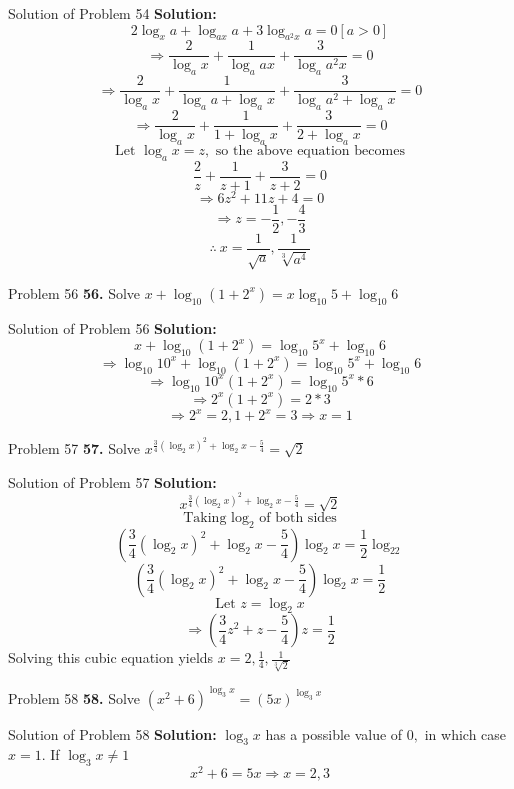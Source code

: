 \documentclass[aspectratio=1610,8pt]{beamer}
\begin{document}
\begin{frame}{Solution of Problem 54}
  \textbf{Solution:} $$2\log_xa + \log_{ax}a + 3\log_{a^2x}a = 0[a > 0]$$
  $$\Rightarrow \frac{2}{\log_ax} + \frac{1}{\log_aax} + \frac{3}{\log_aa^2x} = 0$$
  $$\Rightarrow \frac{2}{\log_ax} + \frac{1}{\log_aa + \log_ax} + \frac{3}{\log_aa^2 + \log_ax} = 0$$
  $$\Rightarrow \frac{2}{\log_ax} + \frac{1}{1 + \log_ax} + \frac{3}{2+ \log_ax} = 0$$
  $$\text{Let~}\log_ax= z,\text{~so the above equation becomes}$$
  $$\frac{2}{z} + \frac{1}{z + 1} + \frac{3}{z + 2} = 0$$
  $$\Rightarrow 6z^2 + 11z + 4 = 0$$
  $$\Rightarrow z = -\frac{1}{2}, -\frac{4}{3}$$
  $$\therefore ~x = \frac{1}{\sqrt{a}}, \frac{1}{\sqrt[3]{a^4}}$$
\end{frame}
\begin{frame}{Problem 56}
  \textbf{56.} Solve $x + \log_{10}(1 + 2^x) = x\log_{10}5 + \log_{10}6$
\end{frame}
\begin{frame}{Solution of Problem 56}
  \textbf{Solution:} $$x + \log_{10}(1 + 2^x) = \log_{10}5^x + \log_{10}6$$
  $$\Rightarrow \log_{10}10^x + \log_{10}(1 + 2^x) = \log_{10}5^x + \log_{10}6$$
  $$\Rightarrow \log_{10}10^x(1 + 2^x) = \log_{10}5^x*6$$
  $$\Rightarrow 2^x(1 + 2^x) = 2*3$$
  $$\Rightarrow 2^x = 2, 1 + 2^x = 3 \Rightarrow x = 1$$
\end{frame}
\begin{frame}{Problem 57}
  \textbf{57.} Solve $x^{\frac{3}{4}(\log_2x)^2 +\log_2x - \frac{5}{4}} = \sqrt{2}$
\end{frame}
\begin{frame}{Solution of Problem 57}
  \textbf{Solution:} $$x^{\frac{3}{4}(\log_2x)^2 +\log_2x - \frac{5}{4}} = \sqrt{2}$$
  $$\text{Taking~}\log_2\text{~of both sides}$$
  $$\left(\frac{3}{4}(\log_2x)^2 + \log_2x - \frac{5}{4}\right)\log_2x = \frac{1}{2}\log_22$$
  $$\left(\frac{3}{4}(\log_2x)^2 + \log_2x - \frac{5}{4}\right)\log_2x = \frac{1}{2}$$
  $$\text{Let~}z = \log_2x$$
  $$\Rightarrow \left(\frac{3}{4}z^2 + z - \frac{5}{4}\right)z = \frac{1}{2}$$
  Solving this cubic equation yields $x = 2, \frac{1}{4}, \frac{1}{\sqrt[3]{2}}$
\end{frame}
\begin{frame}{Problem 58}
  \textbf{58.} Solve $(x^2 + 6)^{\log_3x} = (5x)^{\log_3x}$
\end{frame}
\begin{frame}{Solution of Problem 58}
  \textbf{Solution:} $\log_3x$ has a possible value of $0,$ in which case $x = 1.$ If $\log_3x \neq 1$
  $$x^2 + 6 = 5x\Rightarrow x = 2,3$$
\end{frame}
\end{document}

